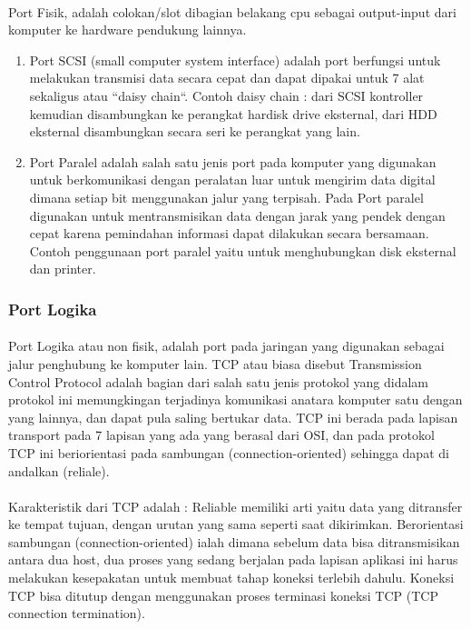 \documentclass[12pt,a4paper]{article}
\begin{document}
\paragraph{}
\hspace{1cm}
Port Fisik, adalah colokan/slot dibagian belakang cpu sebagai output-input dari komputer ke hardware pendukung lainnya. \\
\begin{enumerate}
\item Port SCSI (small computer system interface) adalah port berfungsi untuk melakukan transmisi data secara cepat dan dapat dipakai untuk 7 alat sekaligus atau “daisy chain“. Contoh daisy chain : dari SCSI kontroller kemudian disambungkan ke perangkat hardisk drive eksternal, dari HDD eksternal disambungkan secara seri ke perangkat yang lain.
\item Port Paralel adalah  salah satu jenis port pada komputer yang digunakan untuk berkomunikasi dengan peralatan luar untuk mengirim data digital dimana setiap bit menggunakan jalur yang terpisah. Pada Port paralel digunakan untuk mentransmisikan data dengan jarak yang pendek dengan cepat karena pemindahan informasi dapat dilakukan secara bersamaan. Contoh penggunaan port paralel yaitu untuk menghubungkan disk eksternal dan printer.
\end{enumerate}
\subsubsection {Port Logika}

\paragraph{}
\hspace{1cm} 
Port Logika atau non fisik, adalah port pada jaringan yang digunakan sebagai jalur penghubung ke komputer lain. TCP atau biasa disebut Transmission Control Protocol adalah bagian dari salah satu jenis protokol yang didalam protokol ini memungkingan terjadinya komunikasi anatara komputer satu dengan yang lainnya, dan dapat pula saling bertukar data. TCP ini berada pada lapisan transport pada 7 lapisan yang ada yang berasal dari OSI, dan pada protokol TCP ini beriorientasi pada sambungan (connection-oriented) sehingga dapat di andalkan (reliale).

\paragraph{}
\hspace{1cm}
Karakteristik dari TCP adalah :
Reliable memiliki arti yaitu data yang ditransfer ke tempat tujuan,  dengan urutan yang sama seperti saat dikirimkan.
Berorientasi sambungan (connection-oriented) ialah dimana sebelum data bisa ditransmisikan antara dua host, dua proses yang sedang berjalan pada lapisan aplikasi ini harus melakukan kesepakatan untuk membuat tahap koneksi terlebih dahulu. Koneksi TCP bisa ditutup dengan menggunakan proses terminasi koneksi TCP (TCP connection termination).
\end{document}
